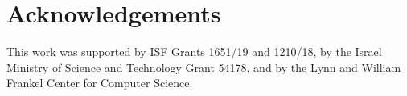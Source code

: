 \documentclass[letterpaper]{article}
\begin{document}










\section{Acknowledgements}
This work was supported by ISF Grants 1651/19 and 1210/18, by the Israel Ministry of Science and Technology Grant 54178, and by the Lynn and William Frankel Center for Computer Science.  

%
   
\end{document}
